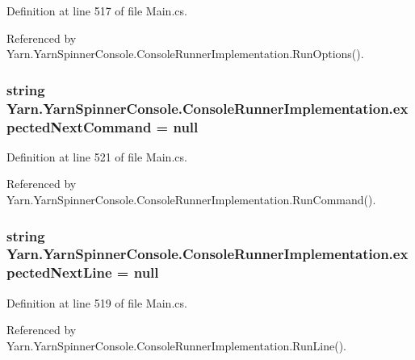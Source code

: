 Definition at line 517 of file Main.\-cs.



Referenced by Yarn.\-Yarn\-Spinner\-Console.\-Console\-Runner\-Implementation.\-Run\-Options().

\hypertarget{a00053_a3c7133c65dc7cf293f49b61426a0c4aa}{
\subsubsection[{expected\-Next\-Command}]{\setlength{\rightskip}{0pt plus 5cm}string Yarn.\-Yarn\-Spinner\-Console.\-Console\-Runner\-Implementation.\-expected\-Next\-Command = null}}\label{a00053_a3c7133c65dc7cf293f49b61426a0c4aa}


Definition at line 521 of file Main.\-cs.



Referenced by Yarn.\-Yarn\-Spinner\-Console.\-Console\-Runner\-Implementation.\-Run\-Command().

\hypertarget{a00053_a33a44e39f2d90850cee234dfad50f2c5}{
\subsubsection[{expected\-Next\-Line}]{\setlength{\rightskip}{0pt plus 5cm}string Yarn.\-Yarn\-Spinner\-Console.\-Console\-Runner\-Implementation.\-expected\-Next\-Line = null}}\label{a00053_a33a44e39f2d90850cee234dfad50f2c5}


Definition at line 519 of file Main.\-cs.



Referenced by Yarn.\-Yarn\-Spinner\-Console.\-Console\-Runner\-Implementation.\-Run\-Line().

